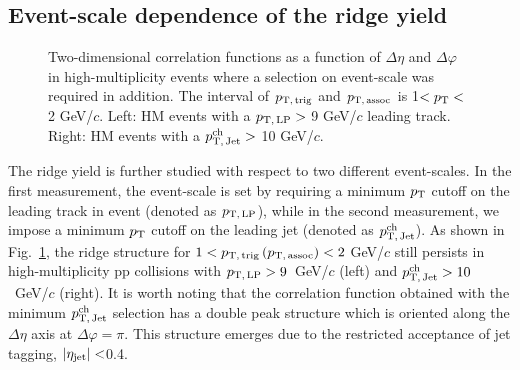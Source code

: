 \subsection{Event-scale dependence of the ridge yield}
\begin{figure}[h!]
	\centering
	\caption{ Two-dimensional correlation functions as a function of $\Delta\eta$ and $\Delta\varphi$ in high-multiplicity events where a selection on event-scale was required in addition. The interval of $p_\mathrm{T,\,trig}$ and $p_\mathrm{T,\,assoc}$ is 1$<p_\mathrm{T}<$2 GeV/$c$. Left: HM events with a $p_\mathrm{T,\,LP}>$ 9 GeV/$c$ leading track. Right: HM events with a $p_\mathrm{T,\,Jet}^\mathrm{ch}>$ 10 GeV/$c$.}
	\label{fig:PlotCorrHMTSel}
\end{figure}

The ridge yield is further studied with respect to two different event-scales. In the first measurement, the event-scale is set by requiring a minimum $p_\mathrm{T}$ cutoff on the leading track in event (denoted as $p_\mathrm{T,\,LP}$), while in the second measurement, we impose a minimum $p_\mathrm{T}$ cutoff on the leading jet (denoted as $p_\mathrm{T,\,Jet}^\mathrm{ch}$). As shown in Fig.~\ref{fig:PlotCorrHMTSel}, the ridge structure for $1< p_\mathrm{T,\,trig}\,(p_\mathrm{T,\,assoc}) <2$ GeV/$c$ still persists in high-multiplicity pp collisions with $p_\mathrm{T,\,LP}>9$~GeV/$c$ (left) and $p_\mathrm{T,\,Jet}^\mathrm{ch}>10$~GeV/$c$ (right).  %
It is worth noting that the correlation function obtained with the minimum $p_\mathrm{T,\,Jet}^\mathrm{ch}$ selection has a double peak structure which is oriented along the $\Delta\eta$ axis at $\Delta\varphi=\pi$. This structure emerges due to the restricted acceptance of jet tagging, $|\eta_{\rm{jet}}|<$0.4.

